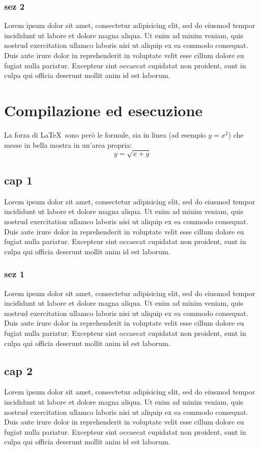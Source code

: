 \documentclass[a4paper,10pt]{report} %
\begin{document}
    \section{sez 2}
      Lorem ipsum dolor sit amet, consectetur adipisicing elit, sed do eiusmod tempor incididunt ut labore et dolore magna aliqua. Ut enim ad minim veniam, quis nostrud exercitation ullamco laboris nisi ut aliquip ex ea commodo consequat. Duis aute irure dolor in reprehenderit in voluptate velit esse cillum dolore eu fugiat nulla pariatur. Excepteur sint occaecat cupidatat non proident, sunt in culpa qui officia deserunt mollit anim id est laborum.
\newpage
\part{Compilazione ed esecuzione} %
	La forza di \LaTeX\ sono però le formule, sia in linea (ad esempio \(y=x^2\))
   che messe in bella mostra in un'area propria:
  \[y=\sqrt{x+y}\]
  \chapter{cap 1}
    Lorem ipsum dolor sit amet, consectetur adipisicing elit, sed do eiusmod tempor incididunt ut labore et dolore magna aliqua. Ut enim ad minim veniam, quis nostrud exercitation ullamco laboris nisi ut aliquip ex ea commodo consequat. Duis aute irure dolor in reprehenderit in voluptate velit esse cillum dolore eu fugiat nulla pariatur. Excepteur sint occaecat cupidatat non proident, sunt in culpa qui officia deserunt mollit anim id est laborum.
    \section{sez 1}
      Lorem ipsum dolor sit amet, consectetur adipisicing elit, sed do eiusmod tempor incididunt ut labore et dolore magna aliqua. Ut enim ad minim veniam, quis nostrud exercitation ullamco laboris nisi ut aliquip ex ea commodo consequat. Duis aute irure dolor in reprehenderit in voluptate velit esse cillum dolore eu fugiat nulla pariatur. Excepteur sint occaecat cupidatat non proident, sunt in culpa qui officia deserunt mollit anim id est laborum.
  \chapter{cap 2}
    Lorem ipsum dolor sit amet, consectetur adipisicing elit, sed do eiusmod tempor incididunt ut labore et dolore magna aliqua. Ut enim ad minim veniam, quis nostrud exercitation ullamco laboris nisi ut aliquip ex ea commodo consequat. Duis aute irure dolor in reprehenderit in voluptate velit esse cillum dolore eu fugiat nulla pariatur. Excepteur sint occaecat cupidatat non proident, sunt in culpa qui officia deserunt mollit anim id est laborum.
\end{document}
